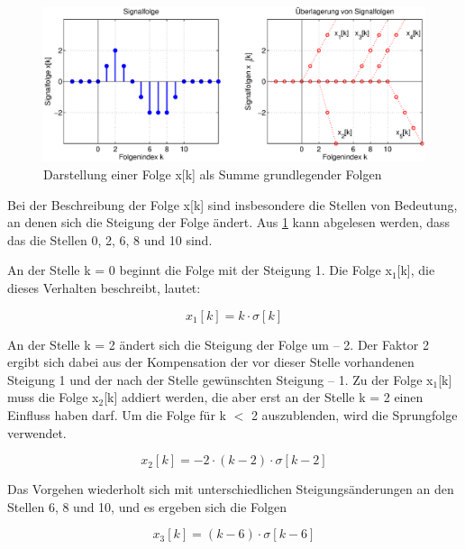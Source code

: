 \begin{figure}[H]
  \centerline{\includegraphics[width=1\textwidth]{Kapitel3/Bilder/image18.eps}}
  \caption{Darstellung einer Folge x[k] als Summe grundlegender Folgen}
  \label{fig:UeberlagerungFolgen}
\end{figure}

\noindent Bei der Beschreibung der Folge x[k] sind insbesondere die Stellen von Bedeutung, an denen sich die Steigung der Folge \"{a}ndert. Aus \ref{fig:UeberlagerungFolgen} kann abgelesen werden, dass das die Stellen 0, 2, 6, 8 und 10 sind.

\noindent An der Stelle k = 0 beginnt die Folge mit der Steigung 1. Die Folge x${}_{1}$[k], die dieses Verhalten beschreibt, lautet:

\begin{equation}\label{eq:threefourtythree}
x_{1} \left[k\right]=k\cdot \sigma \left[k\right]
\end{equation}

\noindent An der Stelle k = 2 \"{a}ndert sich die Steigung der Folge um -- 2. Der Faktor 2 ergibt sich dabei aus der Kompensation der vor dieser Stelle vorhandenen Steigung 1 und der nach der Stelle gew\"{u}nschten Steigung -- 1. Zu der Folge x${}_{1}$[k] muss die Folge x${}_{2}$[k] addiert werden, die aber erst an der Stelle k = 2 einen Einfluss haben darf. Um die Folge f\"{u}r k $\mathrm{<}$ 2 auszublenden, wird die Sprungfolge verwendet. 

\begin{equation}\label{eq:threefourtyfour}
x_{2} \left[k\right]=-2\cdot \left(k-2\right)\cdot \sigma \left[k-2\right]
\end{equation}

\noindent Das Vorgehen wiederholt sich mit unterschiedlichen Steigungs\"{a}nderungen an den Stellen 6, 8 und 10, und es ergeben sich die Folgen 

\begin{equation}\label{eq:threefourtyfive}
x_{3} \left[k\right]=\left(k-6\right)\cdot \sigma \left[k-6\right]
\end{equation}

